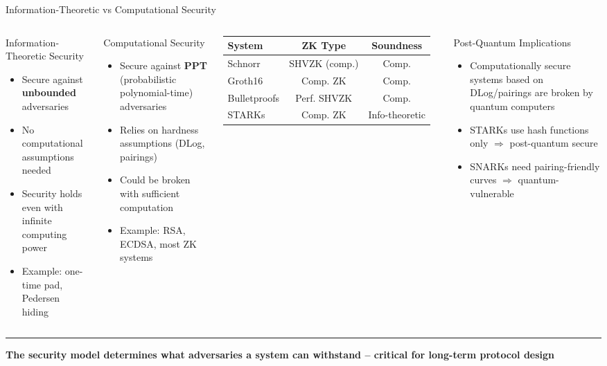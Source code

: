 \documentclass[8pt,aspectratio=169]{beamer}
\newcommand{\bottomnote}[1]{\vfill\vspace{-2mm}\textcolor{mllavender2}{\rule{\textwidth}{0.4pt}}\vspace{1mm}\footnotesize\textbf{#1}}
\begin{document}
\begin{frame}{Information-Theoretic vs Computational Security}
\begin{columns}[T]
\begin{block}{Information-Theoretic Security}
\footnotesize
\begin{itemize}
  \item Secure against \textbf{unbounded} adversaries
  \item No computational assumptions needed
  \item Security holds even with infinite computing power
  \item Example: one-time pad, Pedersen hiding
\end{itemize}
\end{block}
\vspace{2mm}
\begin{block}{Computational Security}
\footnotesize
\begin{itemize}
  \item Secure against \textbf{PPT} (probabilistic polynomial-time) adversaries
  \item Relies on hardness assumptions (DLog, pairings)
  \item Could be broken with sufficient computation
  \item Example: RSA, ECDSA, most ZK systems
\end{itemize}
\end{block}

\footnotesize
\begin{tabular}{lcc}
\toprule
\textbf{System} & \textbf{ZK Type} & \textbf{Soundness} \\
\midrule
Schnorr & SHVZK (comp.) & Comp. \\
Groth16 & Comp. ZK & Comp. \\
Bulletproofs & Perf. SHVZK & Comp. \\
STARKs & Comp. ZK & Info-theoretic \\
\bottomrule
\end{tabular}
\vspace{3mm}
\begin{alertblock}{\footnotesize Post-Quantum Implications}
\footnotesize
\begin{itemize}
  \item Computationally secure systems based on DLog/pairings are broken by quantum computers
  \item STARKs use hash functions only $\Rightarrow$ post-quantum secure
  \item SNARKs need pairing-friendly curves $\Rightarrow$ quantum-vulnerable
\end{itemize}
\end{alertblock}
\end{columns}
\bottomnote{The security model determines what adversaries a system can withstand -- critical for long-term protocol design}
\end{frame}
\end{document}
